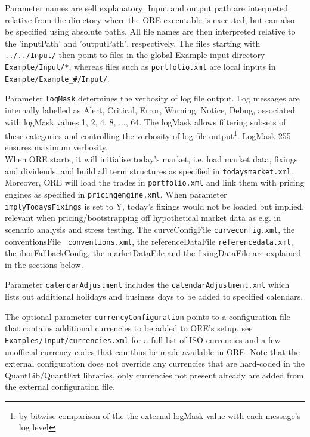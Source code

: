 \documentclass[12pt, a4paper]{article}
\begin{document}
Parameter names are self explanatory: Input and output path are interpreted relative from the directory where the ORE
executable is executed, but can also be specified using absolute paths. All file names are then interpreted relative to the
'inputPath' and 'outputPath', respectively. The files starting with {\tt ../../Input/} then point to files in the global
Example input directory {\tt Example/Input/*}, whereas files such as {\tt portfolio.xml} are local inputs in {\tt 
Example/Example\_\#/Input/}. 

Parameter {\tt logMask} determines the verbosity of log file output. Log messages are 
internally labelled as Alert, Critical, Error, Warning, Notice, Debug, associated with logMask values 1, 2, 4, 8, ..., 64. 
The logMask allows filtering subsets of these categories and controlling the verbosity of log file output\footnote{by bitwise comparison of the the external logMask value with each message's log level}. LogMask 255 ensures maximum verbosity. \\

When ORE starts, it will initialise today's market, i.e. load market data, fixings and dividends, and build all term
structures as specified in {\tt todaysmarket.xml}.  Moreover, ORE will load the trades in {\tt portfolio.xml} and link
them with pricing engines as specified in {\tt pricingengine.xml}. When parameter {\tt implyTodaysFixings} is set to Y,
today's fixings would not be loaded but implied, relevant when pricing/bootstrapping off hypothetical market data as
e.g. in scenario analysis and stress testing. The curveConfigFile {\tt curveconfig.xml}, the conventionsFile {\tt
  conventions.xml}, the referenceDataFile {\tt referencedata.xml}, the iborFallbackConfig, the marketDataFile and the
fixingDataFile are explained in the sections below.

\medskip Parameter {\tt calendarAdjustment} includes the {\tt calendarAdjustment.xml} which lists out additional holidays and
business days to be added to specified calendars.

\medskip The optional parameter {\tt currencyConfiguration} points to a configuration file that contains additional currencies
to be added to ORE's setup, see {\tt Examples/Input/currencies.xml} for a full list of ISO currencies and a few unofficial currency
codes that can thus be made available in ORE. Note that the external configuration does not override any currencies that are
hard-coded in the QuantLib/QuantExt libraries, only currencies not present already are added from the external configuration file.
\end{document}
